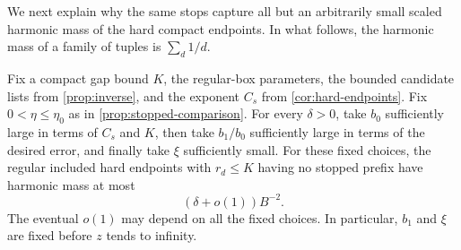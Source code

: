 We next explain why the same stops capture all but an arbitrarily small
scaled harmonic mass of the hard compact endpoints.  In what follows,
the harmonic mass of a family of tuples is $\sum_d1/d$.

\begin{proposition}
\label{prop:hard-stopping}
Fix a compact gap bound $K$, the regular-box parameters, the bounded
candidate lists from \cref{prop:inverse}, and the exponent $C_s$
from \cref{cor:hard-endpoints}.  Fix
$0<\eta\le\eta_0$ as in \cref{prop:stopped-comparison}.
For every $\delta>0$, take $b_0$ sufficiently large in terms of $C_s$
and $K$, then take $b_1/b_0$ sufficiently large in terms of the desired
error, and finally take $\xi$ sufficiently small.  For these fixed
choices, the regular included hard endpoints with $r_d\le K$ having
no stopped prefix have harmonic mass at most
\begin{equation}\label{eq:stops-hard-mass}
 (\delta+o(1))B^{-2}.
\end{equation}
The eventual $o(1)$ may depend on all the fixed choices.  In particular,
$b_1$ and $\xi$ are fixed before $z$ tends to infinity.
\end{proposition}

